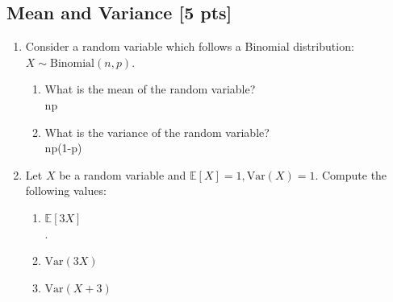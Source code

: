 \documentclass[a4paper]{article}
\theoremstyle{definition}
\newcommand{\Var}{\mathrm{Var}}
\newenvironment{soln}{
    \leavevmode\color{blue}\ignorespaces
}{}
\begin{document}
\subsection{Mean and Variance [5 pts]}
\begin{enumerate}
\item Consider a random variable which follows a Binomial
  distribution: $X \sim \text{Binomial}(n, p)$.
  \begin{enumerate}
  \item What is the mean of the random variable?\\
    \begin{soln}  np \end{soln}
  \item What is the variance of the random variable?\\
    \begin{soln} np(1-p) \end{soln}
  \end{enumerate}

\item Let $X$ be a random variable and
  $\mathbb{E}[X] = 1, \Var(X) = 1$. Compute the following values:
  \begin{enumerate}
  \item $\mathbb{E}[3X]$\\
    \begin{soln}  3. \end{soln}
  \item $\Var(3X)$\\
    \begin{soln}  9 \end{soln}
  \item $\Var(X+3)$\\
    \begin{soln}  3 \end{soln}
  \end{enumerate}
\end{enumerate}

\end{document}
